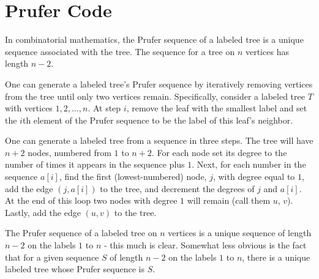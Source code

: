 \section{Prufer Code}
In combinatorial mathematics, the Prufer sequence of a labeled tree is a unique sequence associated with the tree. The sequence for a tree on $n$ vertices has length $n-2$.

One can generate a labeled tree's Prufer sequence by iteratively removing vertices from the tree until only two vertices remain. Specifically, consider a labeled tree $T$ with vertices ${1, 2, ..., n}$. At step $i$, remove the leaf with the smallest label and set the $i$th element of the Prufer sequence to be the label of this leaf's neighbor.

One can generate a labeled tree from a sequence in three steps. The tree will have $n+2$ nodes, numbered from $1$ to $n+2$. For each node set its degree to the number of times it appears in the sequence plus $1$. Next, for each number in the sequence $a[i]$, find the first (lowest-numbered) node, $j$, with degree equal to $1$, add the edge $(j, a[i])$ to the tree, and decrement the degrees of $j$ and $a[i]$. At the end of this loop two nodes with degree $1$ will remain (call them $u$, $v$). Lastly, add the edge $(u,v)$ to the tree.

The Prufer sequence of a labeled tree on $n$ vertices is a unique sequence of length $n-2$ on the labels $1$ to $n$ - this much is clear. Somewhat less obvious is the fact that for a given sequence $S$ of length $n-2$ on the labels $1$ to $n$, there is a unique labeled tree whose Prufer sequence is $S$.